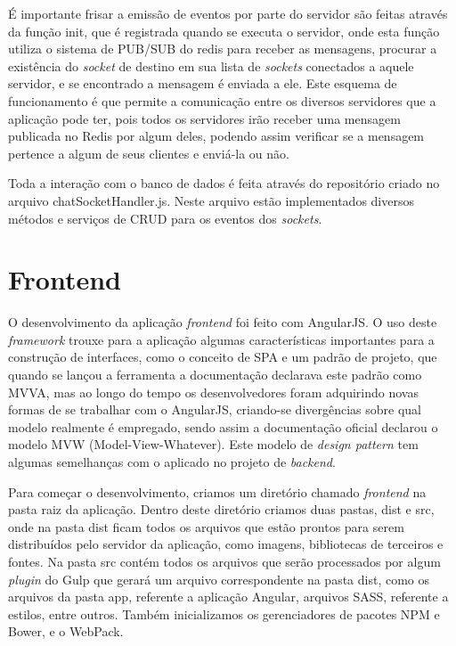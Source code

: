 É importante frisar a emissão de eventos por parte do servidor são feitas através da função init, que é registrada quando se executa o servidor, onde esta função utiliza o sistema de PUB/SUB do redis para receber as mensagens, procurar a existência do \textit{socket} de destino em sua lista de \textit{sockets} conectados a aquele servidor, e se encontrado a mensagem é enviada a ele. Este esquema de funcionamento é que permite a comunicação entre os diversos servidores que a aplicação pode ter, pois todos os servidores irão receber uma mensagem publicada no Redis por algum deles, podendo assim verificar se a mensagem pertence a algum de seus clientes e enviá-la ou não.

Toda a interação com o banco de dados é feita através do repositório criado no arquivo chatSocketHandler.js. Neste arquivo estão implementados diversos métodos e serviços de CRUD para os eventos dos \textit{sockets}.

\section{Frontend}
O desenvolvimento da aplicação \textit{frontend} foi feito com AngularJS. O uso deste \textit{framework} trouxe para a aplicação algumas características importantes para a construção de interfaces, como o conceito de SPA e um padrão de projeto, que quando se lançou a ferramenta a documentação declarava este padrão como MVVA, mas ao longo do tempo os desenvolvedores foram adquirindo novas formas de se trabalhar com o AngularJS, criando-se divergências sobre qual modelo realmente é empregado, sendo assim a documentação oficial declarou o modelo MVW (Model-View-Whatever). Este modelo de \textit{design pattern} tem algumas semelhanças com o aplicado no projeto de \textit{backend}.

Para começar o desenvolvimento, criamos um diretório chamado \textit{frontend} na pasta raiz da aplicação. Dentro deste diretório criamos duas pastas, dist e src, onde na pasta dist ficam todos os arquivos que estão prontos para serem distribuídos pelo servidor da aplicação, como imagens, bibliotecas de terceiros e fontes. Na pasta src contém todos os arquivos que serão processados por algum \textit{plugin} do Gulp que gerará um arquivo correspondente na pasta dist, como os arquivos da pasta app, referente a aplicação Angular, arquivos SASS, referente a estilos, entre outros. Também inicializamos os gerenciadores de pacotes NPM e Bower, e o WebPack.

